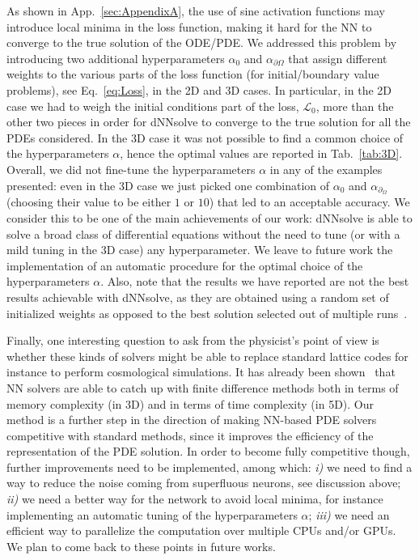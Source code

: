\documentclass{article}
\begin{document}
As shown in App.~\ref{sec:AppendixA}, the use of sine activation functions may introduce local minima in the loss function, making it hard for the NN to converge to the true solution of the ODE/PDE. We addressed this problem by introducing two additional hyperparameters $\alpha_0$ and $\alpha_{\partial\Omega}$ that assign different weights to the various parts of the loss function (for initial/boundary value problems), see Eq.~\eqref{eq:Loss}, in the 2D and 3D cases. In particular, in the 2D case we had to weigh the initial conditions part of the loss, $\mathcal{L}_0$, more than the other two pieces in order for \textsf{dNNsolve} to converge to the true solution for all the PDEs considered. In the 3D case it was not possible to find a common choice of the hyperparameters $\alpha$, hence the optimal values are reported in Tab.~\ref{tab:3D}. Overall, we did not fine-tune the hyperparameters $\alpha$ in any of the examples presented: even in the 3D case we just picked one combination of $\alpha_0$ and $\alpha_{\partial_\Omega}$ (choosing their value to be either $1$ or $10$) that led to an acceptable accuracy. We consider this to be one of the main achievements of our work: \textsf{dNNsolve} is able to solve a broad class of differential equations without the need to tune (or with a mild tuning in the 3D case) any hyperparameter. We leave to future work the implementation of an automatic procedure for the optimal choice of the hyperparameters $\alpha$. Also, note that the results we have reported are not the best results achievable with \textsf{dNNsolve}, as they are obtained using a random set of initialized weights as opposed to the best solution selected out of multiple runs~\cite{lu2020deepxde}.

Finally, one interesting question to ask from the physicist's point of view is whether these kinds of solvers might be able to replace standard lattice codes for instance to perform cosmological simulations. It has already been shown~\cite{avrutskiy2020neural} that NN solvers are able to catch up with finite difference methods both in terms of memory complexity (in 3D) and in terms of time complexity (in 5D). Our method is a further step in the direction of making NN-based PDE solvers competitive with standard methods, since it improves the efficiency of the representation of the PDE solution. In order to become fully competitive though, further improvements need to be implemented, among which: \textit{i)} we need to find a way to reduce the noise coming from superfluous neurons, see discussion above; \textit{ii)} we need a better way for the network to avoid local minima, for instance implementing an automatic tuning of the hyperparameters $\alpha$; \textit{iii)} we need an efficient way to parallelize the computation over multiple CPUs and/or GPUs. We plan to come back to these points in future works.
\end{document}
